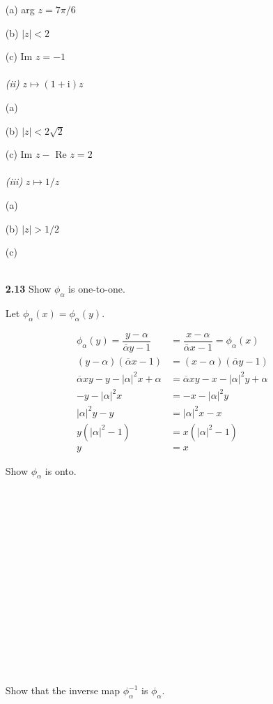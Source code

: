 \begin{enumerate}
\quad (a) arg $z = 7\pi/6$  

\quad (b) $|z| < 2$ 

\quad (c) Im $z = -1$ 
\\\\
\textit{(ii)} $z \mapsto (1+\mathrm{i})z$

\quad (a) 

\quad (b) $|z| < 2\sqrt{2}$ 

\quad (c) Im $z -$ Re $z = 2$ 
\\\\
\textit{(iii)} $z \mapsto 1/z$

\quad (a) 

\quad (b) $|z| > 1/2$ 

\quad (c) 
\\\\
\item[\textbf{2.13}]
Show $\phi_\alpha$ is one-to-one.

Let $\phi_\alpha(x) = \phi_\alpha(y)$.

\begin{align*}
\phi_\alpha(y) = \dfrac{y-\alpha}{\overline{\alpha}y-1} &=
\dfrac{x-\alpha}{\overline{\alpha}x-1}=\phi_\alpha(x)\\
(y-\alpha)(\overline{\alpha}x-1) &= 
(x-\alpha)(\overline{\alpha}y-1) \\
\overline{\alpha}xy -y - |\alpha|^2x + \alpha &= 
\overline{\alpha}xy - x - |\alpha|^2y + \alpha \\
-y-|\alpha|^2x &= -x-|\alpha|^2y\\
|\alpha|^2y-y &= |\alpha|^2x - x\\
y(|\alpha|^2-1) &= x(|\alpha|^2-1) \\
y&=x
\end{align*}

Show $\phi_\alpha$ is onto.
\\\\\\\\\\\\\\\\\\\\\\\\\\\\\\\\
Show that the inverse map $\phi_\alpha^{-1}$ is $\phi_\alpha$.


\end{enumerate}
